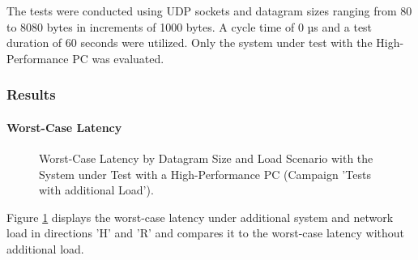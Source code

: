 The tests were conducted using UDP sockets and datagram sizes ranging from 80 to 8080 bytes in increments of 1000 bytes. A cycle time of 0 µs and a test duration of 60 seconds were utilized. Only the system under test with the High-Performance PC was evaluated.

\subsubsection{Results}
\paragraph{Worst-Case Latency}

\begin{figure}[h!]
  \centering
  \caption{Worst-Case Latency by Datagram Size and Load Scenario with the System under Test with a High-Performance PC (Campaign 'Tests with additional Load').}
  \label{fig:StressWc}
\end{figure}

Figure \ref{fig:StressWc} displays the worst-case latency under additional system and network load in directions 'H' and 'R' and compares it to the worst-case latency without additional load.


